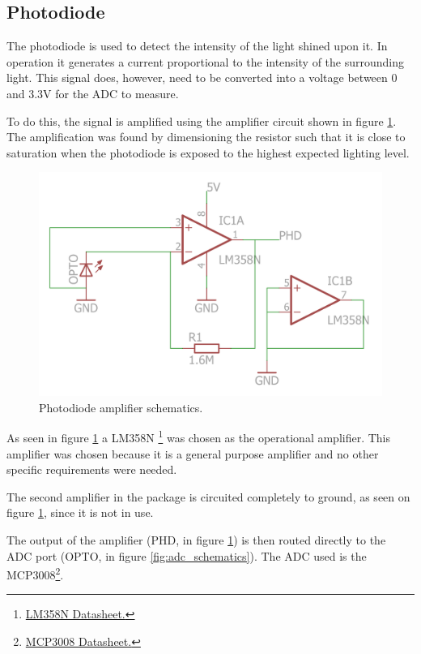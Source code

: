 

\subsection{Photodiode}
\label{sec:photodiode}

The photodiode is used to detect the intensity of the light shined upon it.
In operation it generates a current proportional to the intensity of the surrounding light.
This signal does, however, need to be converted into a voltage between 0 and 3.3V for the ADC to measure.

To do this, the signal is amplified using the amplifier circuit shown in figure \ref{fig:photodiodeschematics}.
The amplification was found by dimensioning the resistor such that it is close to saturation when the photodiode is exposed to the highest expected lighting level.


\begin{figure}[H]
\centering 
\includegraphics[width = 0.6 \textwidth]{images/optoamplifier_schematics}
\caption{Photodiode amplifier schematics.}
\label{fig:photodiodeschematics}
\end{figure}

As seen in figure \ref{fig:photodiodeschematics} a LM358N \footnote{\href{http://docs-europe.electrocomponents.com/webdocs/0780/0900766b807800ef.pdf}{LM358N Datasheet.}} was chosen as the operational amplifier.
This amplifier was chosen because it is  a general purpose amplifier and no other specific requirements were needed.

The second amplifier in the package is circuited completely to ground, as seen on figure \ref{fig:photodiodeschematics}, since it is not in use.

The output of the amplifier (PHD, in figure \ref{fig:photodiodeschematics}) is then routed directly to the ADC port (OPTO, in figure \ref{fig:adc_schematics}).
The ADC used is the MCP3008\footnote{ \href{https://www.adafruit.com/datasheets/MCP3008.pdf}{MCP3008 Datasheet.} }.


